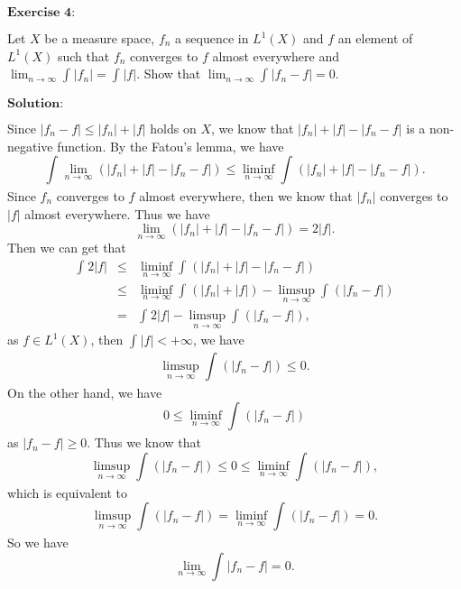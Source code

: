 \documentclass[12pt,a4paper]{ctexart}
\begin{document}
\newpage



$\textbf{Exercise 4:}$

Let $X$ be a measure space, $f_{n}$ a sequence in $L^{1} (X)$ and $f$ an element of $L^{1}(X)$ such that $f_{n}$ converges to $f$ almost everywhere and $\lim_{n \to \infty} \int_{}^{} |f_{n}| = \int_{}^{} |f|$. Show that $\lim_{n \to \infty} \int_{}^{} |f_{n} - f| = 0$.

\vspace{8pt}
$\textbf{Solution:}$

Since $|f_{n} - f| \leq |f_{n}| + |f|$ holds on $X$, we know that $|f_{n}| + |f| - |f_{n} - f|$ is a non-negative function. By the Fatou's lemma, we have
\begin{equation*}
    \int_{}^{} \lim_{n \to \infty} (|f_{n}| + |f| - |f_{n} - f|)  \leq \liminf_{n \to \infty} \int_{}^{} (|f_{n}| + |f| - |f_{n} - f|).
\end{equation*}
Since $f_{n}$ converges to $f$ almost everywhere, then we know that $|f_{n}|$ converges to $|f|$ almost everywhere. Thus we have
\begin{equation*}
    \lim_{n \to \infty} (|f_{n}| + |f| - |f_{n} - f|) = 2 |f|.
\end{equation*}
Then we can get that
\begin{eqnarray*}
\int_{}^{} 2 |f| & \leq & \liminf_{n \to \infty} \int_{}^{} (|f_{n}| + |f| - |f_{n} - f|) \\
& \leq & \liminf_{n \to \infty} \int_{}^{} (|f_{n}| + |f|) - \limsup_{n \to \infty}  \int_{}^{} (|f_{n} - f|) \\
& = & \int_{}^{} 2 |f| - \limsup_{n \to \infty}  \int_{}^{} (|f_{n} - f|),
\end{eqnarray*}
as $f \in L^{1}(X)$, then $\int_{}^{} |f| < + \infty$, we have
\begin{equation*}
    \limsup_{n \to \infty}  \int_{}^{} (|f_{n} - f|) \leq 0.
\end{equation*}
On the other hand, we have
\begin{equation*}
    0 \leq \liminf_{n \to \infty}  \int_{}^{} (|f_{n} - f|)
\end{equation*}
as $|f_{n} - f| \geq 0$. Thus we know that
\begin{equation*}
    \limsup_{n \to \infty}  \int_{}^{} (|f_{n} - f|) \leq 0 \leq \liminf_{n \to \infty}  \int_{}^{} (|f_{n} - f|),
\end{equation*}
which is equivalent to
\begin{equation*}
    \limsup_{n \to \infty}  \int_{}^{} (|f_{n} - f|) = \liminf_{n \to \infty}  \int_{}^{} (|f_{n} - f|) = 0.
\end{equation*}
So we have
\begin{equation*}
    \lim_{n \to \infty} \int_{}^{} |f_{n} - f| = 0.
\end{equation*}
\end{document}
